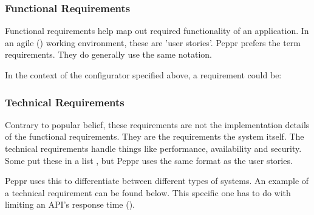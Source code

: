 \subsubsection{Functional Requirements}
Functional requirements help map out required functionality of an application. In an agile (\cite{agileUserStories}) working environment, these are 'user stories'. Peppr prefers the term requirements. They do generally use the same notation. \newline

\newline

In the context of the configurator specified above, a requirement could be: \newline

\newline

\subsubsection{Technical Requirements}
Contrary to popular belief, these requirements are not the implementation details of the functional requirements. They are the requirements the system itself. The technical requirements handle things like performance, availability and security. Some put these in a list \cite{agileTechnicalRequirements}, but Peppr uses the same format as the user stories. \newline

\newline

Peppr uses this to differentiate between different types of systems. An example of a technical requirement can be found below. This specific one has to do with limiting an API's response time (\cite{responseTimes}).

\newline


